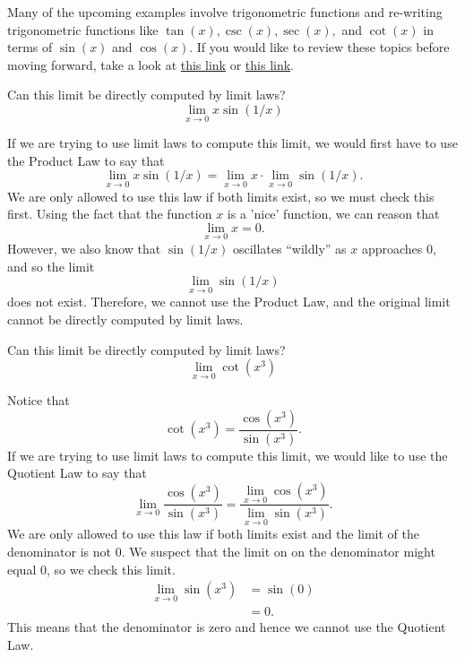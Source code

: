 \documentclass{ximera}
\begin{document}
Many of the upcoming examples involve trigonometric functions and re-writing trigonometric functions like $\tan(x), \csc(x), \sec(x),$ and $\cot(x)$ in terms of $\sin(x)$ and $\cos(x)$.  If you would like to review these topics before moving forward, take a look at \href{https://ximera.osu.edu/math160fa17/m160prerequisites/prerequisiteVideos/trigUnitCircle}{this link} or \href{https://ximera.osu.edu/math160fa17/m160prerequisites/reviewOfFamousFunctions/digInTrigonometricFunctions}{this link}. 

\begin{question}
  Can this limit be directly computed by limit laws?
  \[
  \displaystyle\lim_{x\to 0} x\sin(1/x)
  \]
  \begin{multipleChoice}
  \end{multipleChoice}
  \begin{feedback}
    If we are trying to use limit laws to compute this limit, we would
    first have to use the Product Law to say that
    \[
    \displaystyle\lim_{x\to 0}x\sin(1/x)= \lim_{x\to 0} x \cdot \lim_{x\to 0} \sin(1/x).
    \]
    We are only allowed to use this law if both limits exist, so we
    must check this first.  Using the fact that the function $x$ is a 'nice' function, we can reason that
    \[
    \displaystyle\lim_{x\to  0}x=0.
    \]
    However, we also know that $\sin(1/x)$ oscillates ``wildly'' as
    $x$ approaches $0$, and so the limit
    \[
    \lim_{x\to 0} \sin(1/x)
    \]does not exist.  Therefore, we cannot use the
    Product Law, and the original limit cannot be directly computed by limit laws.
  \end{feedback}
\end{question}

\begin{question}
  Can this limit be directly computed by limit laws?
  \[
  \displaystyle\lim_{x\to 0} \cot(x^3)
  \]
  \begin{multipleChoice}
  \end{multipleChoice}
  \begin{feedback}
    Notice that
    \[
    \cot(x^3) = \frac{\cos(x^3)}{\sin(x^3)}.
    \]
    If we are trying to use limit laws to compute this limit, we would
    like to use the Quotient Law to say that
    \[
    \displaystyle\lim_{x\to 0} \frac{\cos(x^3)}{\sin(x^3)} = \displaystyle\frac{\lim_{x\to 0}
      \cos(x^3)}{\lim_{x\to 0} \sin(x^3)}.
    \]
    We are only allowed to use this law if both limits exist and the limit of the
    denominator is not $0$. We suspect that the limit on on the
    denominator might equal $0$, so we check this limit.
    \begin{align*}
      \displaystyle\lim_{x\to 0} \sin(x^3) &= 
\sin(0) \\
      &=0.
  \end{align*}
  This means that the denominator is zero and hence we cannot use the
  Quotient Law.
  \end{feedback}
\end{question}
\end{document}
